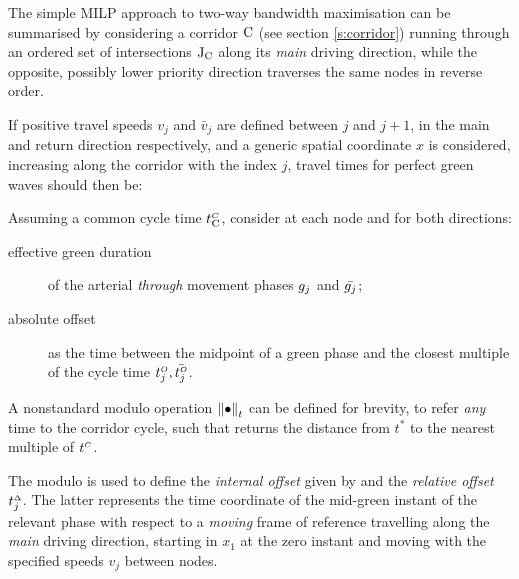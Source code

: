 The simple MILP approach to two-way bandwidth maximisation can be summarised by considering a corridor $\mathrm{C}$ (see section \ref{s:corridor}) running through an ordered set of intersections $\mathrm{J}_{\mathrm{C}}$ along its \emph{main} driving direction, while the opposite,
possibly lower priority direction traverses the same nodes in reverse order.

If positive travel speeds $v_j$ and $\bar{v}_j$ are defined between $j$ and $j+1$,
in the main and return direction respectively, and a generic spatial coordinate $x$ is considered, increasing along the corridor with the index $j$, travel times for perfect green waves should then be:


Assuming a common cycle time $t_{\mathrm{C}}^{\scriptscriptstyle{C}}$, consider at each node and for both directions:
\begin{description}
\item[effective green duration] of the arterial \emph{through} movement phases $g_{j}$ and $\bar{g_{j}}$;
\item[absolute offset] as the time between the midpoint of a green phase and the closest multiple of the cycle time $t_{j}^{\scriptscriptstyle{O}}, \bar{t_{j}^{\scriptscriptstyle{O}}}$.
\end{description}

A nonstandard modulo operation ${\left\| \bullet \right\|}_t$ can be defined for brevity, to refer \emph{any} time to the corridor cycle, such that
\eq{e:milp2}{\tmod{t^*}
\in \left] 
-\frac{\cycle{}}{2} , \frac{\cycle{}}{2} \right]
}
returns the distance from $t^*$ to the nearest multiple of $t_{}^{\scriptscriptstyle{C}}$.

The modulo is used to define the \emph{internal offset} given by
and the \emph{relative offset} $t_{j}^{\scriptscriptstyle{\Delta}}$. The latter represents the time coordinate of the mid-green instant of the relevant phase with respect to a \emph{moving} frame of reference travelling along the \emph{main} driving direction, starting in $x_1$ at the zero instant and moving with the specified speeds $v_j$ between nodes.

